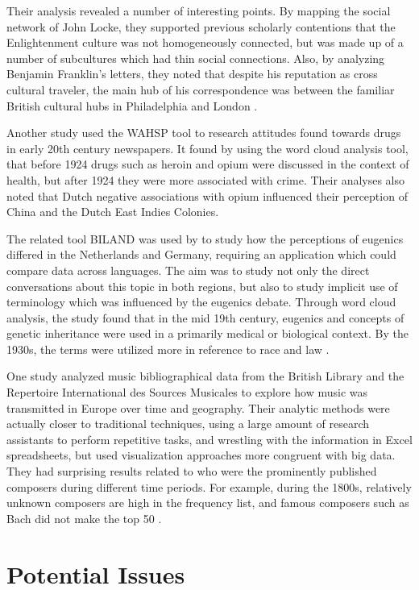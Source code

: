 \documentclass[sigconf]{acmart}
\begin{document}
Their analysis revealed a number of interesting points. By mapping the social network of John Locke, they supported previous scholarly contentions that the Enlightenment culture was not homogeneously connected, but was made up of a number of subcultures which had thin social connections. Also, by analyzing Benjamin Franklin's letters, they noted that despite his reputation as cross cultural traveler, the main hub of his correspondence was between the familiar British cultural hubs in Philadelphia and London \cite{digitalrepublicletters}.

Another study used the WAHSP tool to research attitudes found towards drugs in  early 20th century newspapers. It found by using the word cloud analysis tool, that before 1924  drugs such as heroin and opium were discussed in the context of health, but after 1924 they were more associated with crime. Their analyses also noted that Dutch negative associations with opium influenced their perception of China and the Dutch East Indies Colonies.

The related tool BILAND was used by to study how the perceptions of eugenics differed in the Netherlands and Germany, requiring an application which could compare data across languages. The aim was to study not only the direct conversations about this topic in both regions, but also to study implicit use of terminology which was influenced by the eugenics debate. Through word cloud analysis, the study found that in the mid 19th century, eugenics and concepts of genetic inheritance were used in a primarily medical or biological context. By the 1930s, the terms were utilized more in reference to race and law \cite{bdglobalhist}.

One study analyzed music bibliographical data from the British Library and the Repertoire International des Sources Musicales to explore how music was transmitted in Europe over time and geography. Their analytic methods were actually closer to traditional techniques, using a large amount of research assistants to perform repetitive tasks, and wrestling with the information in Excel spreadsheets, but used visualization approaches more congruent with big data. They had surprising results related to who were the prominently published composers during different time periods. For example, during the 1800s, relatively unknown composers are high in the frequency list, and famous composers such as Bach did not make the top 50 \cite{musichist}.

\section{Potential Issues}
\end{document}
